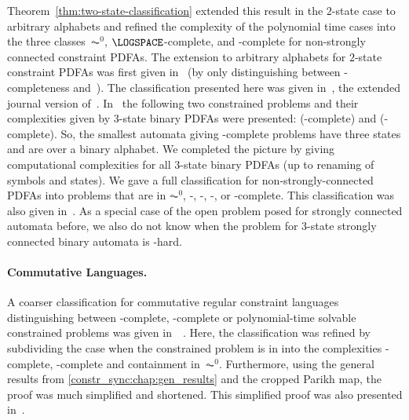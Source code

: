 Theorem~\ref{thm:two-state-classification} extended this result in the $2$-state case 
to arbitrary alphabets and refined the complexity of the polynomial time cases into the three classes~$\AC^0$,
$\LOGSPACE$-complete, and \NL-complete for non-strongly connected constraint PDFAs. 
The extension to arbitrary alphabets for $2$-state constraint PDFAs was
first given in~\cite{DBLP:conf/cocoon/Hoffmann21} (by only distinguishing between \PSPACE-completeness
and~\PTIME). The classification presented here was given in~\cite{HoffmannCocoonExtended},
the extended journal version of~\cite{DBLP:conf/cocoon/Hoffmann21}. 
In~\cite{FernauGHHVW19} the following two 
constrained problems and their complexities given by $3$-state binary PDFAs were presented:  (\NP-complete)
and  (\PSPACE-complete). 
So, the smallest automata giving \NP-complete problems have three states and are over a binary alphabet. 
We completed the picture by giving
computational complexities for all $3$-state binary PDFAs (up to renaming of symbols and states).
We gave a full classification for non-strongly-connected PDFAs
into problems that are in $\AC^0$, \LOGSPACE-, \NL-, \NP-, or \PSPACE-complete.
This classification was also given in~\cite{HoffmannCocoonExtended}.
As a special case of the open problem posed for strongly connected automata
before, we also do not know when the problem
for $3$-state strongly connected binary automata %
is \NL-hard.

\begin{center}
\end{center}

\paragraph{Commutative Languages.} A coarser classification
for commutative regular constraint languages
distinguishing between \PSPACE-complete, \NP-complete
or polynomial-time solvable constrained problems
was given in~~\cite{DBLP:journals/tcs/Hoffmann21}.
Here, the classification was refined
by  subdividing the case
when the constrained problem is in \PTIME into the complexities \NL-complete, \LOGSPACE-complete
and containment in~$\AC^0$.
Furthermore, using the 
general results from \cref{constr_sync:chap:gen_results}
and the cropped Parikh map, the proof was much simplified
and shortened. This simplified proof was also presented in~\cite{HoffmannCocoonExtended}.

